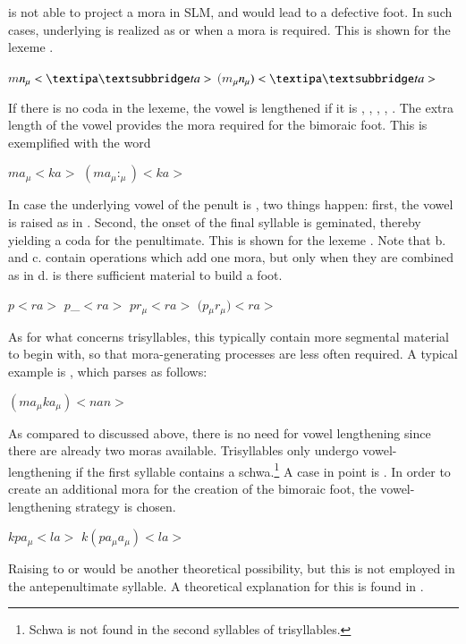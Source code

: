 is not able to project a mora in SLM, and would lead to a defective foot. In such cases, underlying  is realized as  or  when a mora is required. This is shown for the lexeme .

\ea *$m$\E$n_{\mu}<\dentt{}a>$ \z
\ea \label{ex:raisedschwa} $(m$\I$_{\mu}n_{\mu})<\dentt{}a>$ \z

If there is no coda in the lexeme, the vowel is lengthened if it is  
,
,
,
,
. 
The extra length of the vowel provides the mora required for the bimoraic foot. This is exemplified with the word 

\ea
\ea *$ma_{\mu}<ka${\ng}$>$ 
\ex $(ma_{\mu}:_{\mu})<ka$\ng{}$>$ 
\z
\z

In case the underlying vowel of the penult is , two things happen: first, the vowel is raised as in . Second, the onset of the final syllable is geminated, thereby yielding a coda for the penultimate. This is shown for the lexeme . Note that b. and c. contain operations which add one mora, but only when they are combined as in d. is there sufficient material to build a foot.

\ea\ea *$p$\E$<ra$\ng{}$>$ 
\ex *$p$\I_{\mu}$<ra$\ng{}$>$ 
\ex *$p$\E$r_{\mu}<ra$\ng{}$>$ 
\ex $(p$\I$_{\mu}r_{\mu})<ra$\ng{}$>$ 
\z\z
 
As for what concerns trisyllables, this typically contain more segmental material to begin with, so that mora-generating processes are less often required. A typical example is , which parses as follows:

\ea $(ma_{\mu}ka_{\mu})<nan>$ \z

As compared to  discussed above, there is no need for vowel lengthening since there are already two moras available. Trisyllables only undergo vowel-lengthening if the first syllable contains a schwa.\footnote{Schwa
 is not found in the second syllables of trisyllables.
} 
A case in point is . In order to create an additional mora for the creation of the bimoraic foot, the vowel-lengthening strategy is chosen. 

\ea\ea *$k$\E$pa_{\mu}<la>$
\ex $k$\E$(pa_{\mu}a_{\mu})<la>$\z\z

Raising  to  or  would be another theoretical possibility, but this is not employed in the antepenultimate syllable. A theoretical explanation for this is found in \citet{ApoussidouEtAl2009}.

